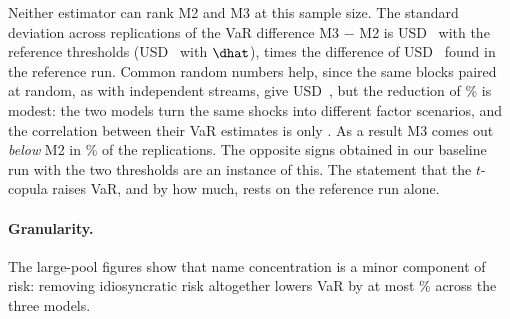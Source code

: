 Neither estimator can rank M2 and M3 at this sample size. The standard deviation across replications of the VaR difference M3 $-$ M2 is USD~ with the reference thresholds (USD~ with $\dhat$),  times the difference of USD~ found in the reference run. Common random numbers help, since the same blocks paired at random, as with independent streams, give USD~, but the reduction of \% is modest: the two models turn the same shocks into different factor scenarios, and the correlation between their VaR estimates is only . As a result M3 comes out \emph{below} M2 in \% of the replications. The opposite signs obtained in our baseline run with the two thresholds are an instance of this. The statement that the $t$-copula raises VaR, and by how much, rests on the reference run alone.

\paragraph{Granularity.}
The large-pool figures show that name concentration is a minor component of risk: removing idiosyncratic risk altogether lowers VaR by at most \% across the three models.
